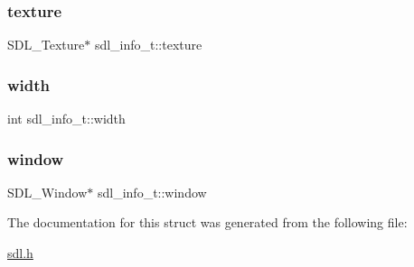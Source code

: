 \subsubsection{\texorpdfstring{texture}{texture}}
{\footnotesize\ttfamily S\+D\+L\+\_\+\+Texture$\ast$ sdl\+\_\+info\+\_\+t\+::texture}

\mbox{\label{structsdl__info__t_a347a3ae7f67b70ba5542d434f7d4dc8b}} 
\subsubsection{\texorpdfstring{width}{width}}
{\footnotesize\ttfamily int sdl\+\_\+info\+\_\+t\+::width}

\mbox{\label{structsdl__info__t_ae06510785e8d9ca03a6371aef2b908fa}} 
\subsubsection{\texorpdfstring{window}{window}}
{\footnotesize\ttfamily S\+D\+L\+\_\+\+Window$\ast$ sdl\+\_\+info\+\_\+t\+::window}



The documentation for this struct was generated from the following file\+:\begin{DoxyCompactItemize}
\item 
\hyperlink{sdl_8h}{sdl.\+h}\end{DoxyCompactItemize}
